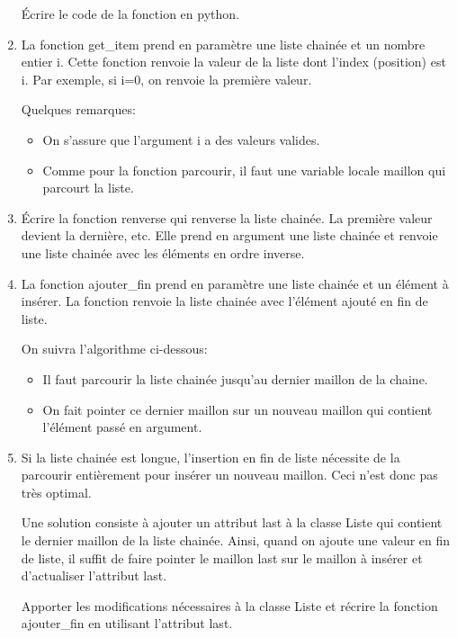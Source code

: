 \documentclass[11pt,a4paper]{article}
\begin{document}
\begin{enumerate}
Écrire le code de la fonction en python.

\item La fonction \textsf{get\_item} prend en paramètre une liste chainée et un nombre entier \textsf{i}. Cette fonction renvoie la valeur de la liste dont l'index (position) est \textsf{i}. Par exemple, si \textsf{i=0}, on renvoie la première valeur.

Quelques remarques:
\begin{itemize}
\item On s'assure que l'argument \textsf{i} a des valeurs valides.
\item Comme pour la fonction parcourir, il faut une variable locale \textsf{maillon} qui parcourt la liste.
\end{itemize}

\item Écrire la fonction \textsf{renverse} qui renverse la liste chainée. La première valeur devient la dernière, etc. Elle prend en argument une liste chainée et renvoie une liste chainée avec les éléments en ordre inverse.


\item La fonction \textsf{ajouter\_fin} prend en paramètre une liste chainée et un élément à insérer. La fonction renvoie la liste chainée avec l'élément ajouté en fin de liste.

On suivra l'algorithme ci-dessous:
\begin{itemize}
\item Il faut parcourir la liste chainée jusqu'au dernier maillon de la chaine.
\item On fait pointer ce dernier maillon sur un nouveau maillon qui contient l'élément passé en argument.
\end{itemize}



\item Si la liste chainée est longue, l'insertion en fin de liste nécessite de la parcourir entièrement pour insérer un nouveau maillon. Ceci n'est donc pas très optimal.

Une solution consiste à ajouter un attribut \textsf{last} à la classe \textsf{Liste} qui contient le dernier maillon de la liste chainée. Ainsi, quand on ajoute une valeur en fin de liste, il suffit de faire pointer le maillon \textsf{last} sur le maillon à insérer et d'actualiser l'attribut \textsf{last}.

Apporter les modifications nécessaires à la classe \textsf{Liste} et récrire la fonction \textsf{ajouter\_fin} en utilisant l'attribut \textsf{last}.

\end{enumerate}
\end{document}
